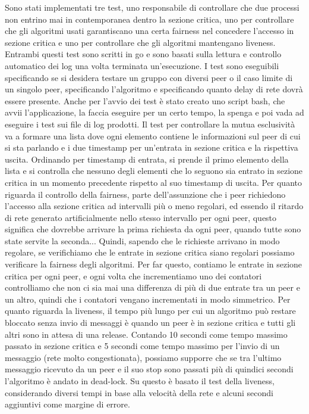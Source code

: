 \documentclass[conference]{IEEEtran}
\begin{document}
Sono stati implementati tre test, uno responsabile di controllare che due processi non entrino mai in contemporanea dentro la sezione critica, uno per controllare che gli algoritmi usati garantiscano una certa fairness nel concedere l'accesso in sezione critica e uno per controllare che gli algoritmi mantengano liveness. Entrambi questi test sono scritti in go e sono basati sulla lettura e controllo automatico dei log una volta terminata un'esecuzione. I test sono eseguibili specificando se si desidera testare un gruppo con diversi peer o il caso limite di un singolo peer, specificando l'algoritmo e specificando quanto delay di rete dovrà essere presente. Anche per l'avvio dei test è stato creato uno script bash, che avvii l'applicazione, la faccia eseguire per un certo tempo, la spenga e poi vada ad eseguire i test sui file di log prodotti. Il test per controllare la mutua esclusività va a formare una lista dove ogni elemento contiene le informazioni sul peer di cui si sta parlando e i due timestamp per un'entrata in sezione critica e la rispettiva uscita. Ordinando per timestamp di entrata, si prende il primo elemento della lista e si controlla che nessuno degli elementi che lo seguono sia entrato in sezione critica in un momento precedente rispetto al suo timestamp di uscita. 
Per quanto riguarda il controllo della fairness, parte dell'assunzione che i peer richiedono l'accesso alla sezione critica ad intervalli più o meno regolari, ed essendo il ritardo di rete generato artificialmente nello stesso intervallo per ogni peer, questo significa che dovrebbe arrivare la prima richiesta da ogni peer, quando tutte sono state servite la seconda... Quindi, sapendo che le richieste arrivano in modo regolare, se verifichiamo che le entrate in sezione critica siano regolari possiamo verificare la fairness degli algoritmi. Per far questo, contiamo le entrate in sezione critica per ogni peer, e ogni volta che incrementiamo uno dei contatori controlliamo che non ci sia mai una differenza di più di due entrate tra un peer e un altro, quindi che i contatori vengano incrementati in modo simmetrico. Per quanto riguarda la liveness, il tempo più lungo per cui un algoritmo può restare bloccato senza invio di messaggi è quando un peer è in sezione critica e tutti gli altri sono in attesa di una release. Contando 10 secondi come tempo massimo passato in sezione critica e 5 secondi come tempo massimo per l'invio di un messaggio (rete molto congestionata), possiamo supporre che se tra l'ultimo messaggio ricevuto da un peer e il suo stop sono passati più di quindici secondi l'algoritmo è andato in dead-lock. Su questo è basato il test della liveness, considerando diversi tempi in base alla velocità della rete e alcuni secondi aggiuntivi come margine di errore.
\end{document}
